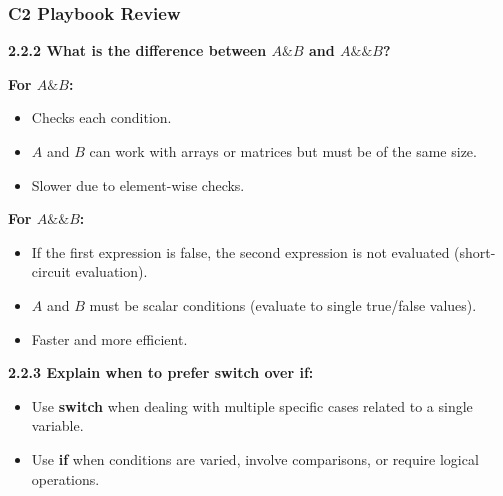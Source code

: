 \documentclass[
	11pt, %
]{beamer}
\begin{document}

\begin{frame}
    \frametitle{C2 Playbook Review}
    \textbf{2.2.2 What is the difference between $A \& B$ and $A \&\& B$?}
    
    \textbf{For $A \& B$:}
    \begin{itemize}
        \item Checks each condition.
        \item $A$ and $B$ can work with arrays or matrices but must be of the same size.
        \item Slower due to element-wise checks.
    \end{itemize}
    
    \textbf{For $A \&\& B$:}
    \begin{itemize}
        \item If the first expression is false, the second expression is not evaluated (short-circuit evaluation).
        \item $A$ and $B$ must be scalar conditions (evaluate to single true/false values).
        \item Faster and more efficient.
    \end{itemize}
    \textbf{2.2.3 Explain when to prefer switch over if:}
    \begin{itemize}
        \item Use \textbf{switch} when dealing with multiple specific cases related to a single variable.
        \item Use \textbf{if} when conditions are varied, involve comparisons, or require logical operations.
    \end{itemize}
    
\end{frame}
\end{document}
